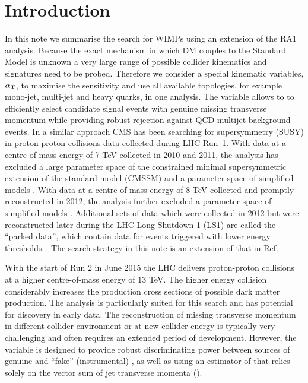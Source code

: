 \section{Introduction}
\label{sec:intro}

In this note we summarise the search for WIMPs using an extension of the RA1 analysis.
Because the exact mechanism in which DM couples to the Standard Model is unknown a very large range of possible collider kinematics 
and signatures need to be probed. Therefore we consider a special kinematic variables,  $\alpha_{\textrm T}$, to maximise
 the sensitivity and use all available topologies, for example mono-jet, multi-jet and heavy quarks, in one analysis.  
The \alphat variable allows to to efficiently select candidate signal events with genuine missing transverse momentum while
providing robust rejection against QCD multijet background events. In a similar approach CMS has been searching for
 supersymmetry (SUSY) in proton-proton collisions data collected during LHC Run~1. With data at a centre-of-mass energy of 7 TeV collected in
2010 and 2011, the \alphat analysis has excluded a large parameter space of the constrained minimal supersymmetric extension of the
standard model (CMSSM) \cite{Khachatryan:2011tk, Chatrchyan:2011zy, Chatrchyan:2012wa} and a parameter space of simplified models
\cite{Chatrchyan:2012wa}. With data at a centre-of-mass energy of 8 TeV collected and promptly reconstructed in 2012, the \alphat analysis
further excluded a parameter space of simplified models \cite{Chatrchyan:2013lya}. Additional sets of data which were
collected in 2012 but were reconstructed later during the LHC Long Shutdown 1 (LS1) are called the ``parked data'', which contain data
for events triggered with lower energy thresholds~\cite{CMS_AN_2013-366}.
The search strategy in this note is an extension of that in Ref. \cite{CMS_AN_2013-366}.

With the start of Run 2 in June 2015 the LHC delivers proton-proton collisions at a higher centre-of-mass
energy of 13 TeV. The higher energy collision considerably increases the production cross sections of possible dark matter production.
The \alphat analysis is particularly suited for this search and has potential for
discovery in early data. The reconstruction of missing transverse momentum in different collider 
environment or at new collider energy is typically very challenging and often requires an extended period of
development. However, the \alphat variable is designed to provide robust discriminating power between sources of genuine and ``fake''
(\eg instrumental) \met, as well as using an estimator of \met that
relies solely on the vector sum of jet transverse momenta (\mht).


